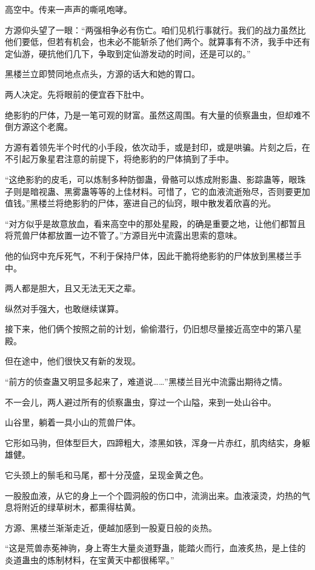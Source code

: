 \begin{this_body}
高空中。传来一声声的嘶吼咆哮。

方源仰头望了一眼：“两强相争必有伤亡。咱们见机行事就行。我们的战力虽然比他们要低，但若有机会，也未必不能斩杀了他们两个。就算事有不济，我手中还有定仙游，硬抗他们几下，争取到定仙游发动的时间，还是可以的。”

黑楼兰立即赞同地点点头，方源的话大和她的胃口。

两人决定。先将眼前的便宜吞下肚中。

绝影豹的尸体，乃是一笔可观的财富。虽然这周围。有大量的侦察蛊虫，但却难不倒方源这个老魔。

方源有着领先半个时代的小手段，依次动手，或是封印，或是哄骗。片刻之后，在不引起万象星君注意的前提下，将绝影豹的尸体搞到了手中。

“这绝影豹的皮毛，可以炼制多种防御蛊，骨骼可以炼成附影蛊、影踪蛊等，眼珠子则是暗视蛊、黑雾蛊等等的上佳材料。可惜了，它的血液流逝殆尽，否则要更加值钱。”黑楼兰将绝影豹的尸体，塞进自己的仙窍，眼中散发着欣喜的光。

“对方似乎是故意放血，看来高空中的那处星殿，的确是重要之地，让他们都暂且将荒兽尸体都放置一边不管了。”方源目光中流露出思索的意味。

他的仙窍中充斥死气，不利于保持尸体，因此干脆将绝影豹的尸体放到黑楼兰手中。

两人都是胆大，且又无法无天之辈。

纵然对手强大，也敢继续谋算。

接下来，他们俩个按照之前的计划，偷偷潜行，仍旧想尽量接近高空中的第八星殿。

但在途中，他们很快又有新的发现。

“前方的侦查蛊又明显多起来了，难道说……”黑楼兰目光中流露出期待之情。

不一会儿，两人避过所有的侦察蛊虫，穿过一个山隘，来到一处山谷中。

山谷里，躺着一具小山的荒兽尸体。

它形如马驹，但体型巨大，四蹄粗大，漆黑如铁，浑身一片赤红，肌肉结实，身躯雄健。

它头颈上的鬃毛和马尾，都十分茂盛，呈现金黄之色。

一股股血液，从它的身上一个个圆洞般的伤口中，流淌出来。血液滚烫，灼热的气息将附近的绿草树木，都熏得枯黄。

方源、黑楼兰渐渐走近，便越加感到一股夏日般的炎热。

“这是荒兽赤莬神驹，身上寄生大量炎道野蛊，能踏火而行，血液炙热，是上佳的炎道蛊虫的炼制材料，在宝黄天中都很稀罕。”


\end{this_body}
